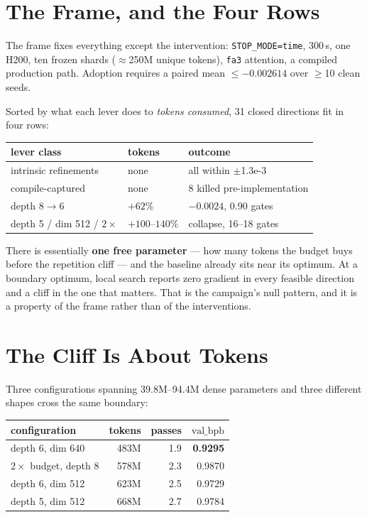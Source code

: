 \documentclass{article}
\newcommand{\vb}{\mathrm{val\_bpb}}
\begin{document}
\section{The Frame, and the Four Rows}
The frame fixes everything except the intervention: \texttt{STOP\_MODE=time}, 300\,s, one H200, ten frozen shards ($\approx$250M unique tokens), \texttt{fa3} attention, a compiled production path. Adoption requires a paired mean $\le -0.002614$ over $\ge$10 clean seeds.

Sorted by what each lever does to \emph{tokens consumed}, 31 closed directions fit in four rows:

\begin{center}\begin{small}
\begin{tabular}{lll}
\toprule
lever class & tokens & outcome \\
\midrule
intrinsic refinements & none & all within $\pm$1.3e-3 \\
compile-captured & none & 8 killed pre-implementation \\
depth $8{\to}6$ & $+62$\% & $-0.0024$, 0.90 gates \\
depth 5 / dim 512 / $2\times$ & $+100$--$140$\% & collapse, 16--18 gates \\
\bottomrule
\end{tabular}
\end{small}\end{center}

There is essentially \textbf{one free parameter} --- how many tokens the budget buys before the repetition cliff --- and the baseline already sits near its optimum. At a boundary optimum, local search reports zero gradient in every feasible direction and a cliff in the one that matters. That is the campaign's null pattern, and it is a property of the frame rather than of the interventions.

\section{The Cliff Is About Tokens}
Three configurations spanning 39.8M--94.4M dense parameters and three different shapes cross the same boundary:

\begin{center}\begin{small}
\begin{tabular}{lrrr}
\toprule
configuration & tokens & passes & $\vb$ \\
\midrule
depth 6, dim 640 & 483M & 1.9 & \textbf{0.9295} \\
$2\times$ budget, depth 8 & 578M & 2.3 & 0.9870 \\
depth 6, dim 512 & 623M & 2.5 & 0.9729 \\
depth 5, dim 512 & 668M & 2.7 & 0.9784 \\
\bottomrule
\end{tabular}
\end{small}\end{center}
\end{document}
